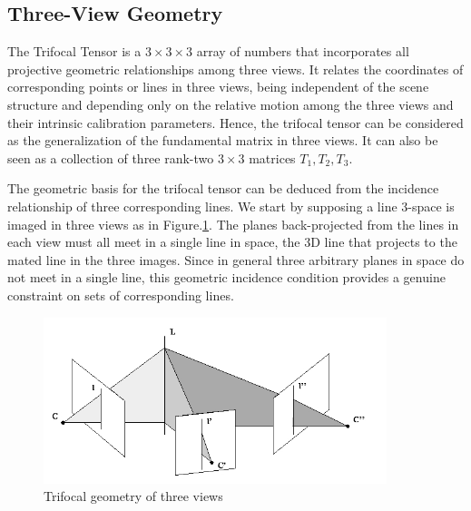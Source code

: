 \subsection{Three-View Geometry}
The Trifocal Tensor is a $3 \times 3 \times 3$ array of numbers that incorporates all projective geometric relationships among three views. It relates the coordinates of corresponding points or lines in three views, being independent of the scene structure and depending only on the relative motion among the three views and their intrinsic calibration parameters. Hence, the trifocal tensor can be considered as the generalization of the fundamental matrix in three views. It can also be seen as a collection of three rank-two $3 \times 3$ matrices $T_1, T_2, T_3$.

The geometric basis for the trifocal tensor can be deduced from the incidence relationship of three corresponding lines. We start by supposing a line 3-space is imaged in three views as in Figure.\ref{fig:threeviews}. The planes back-projected from the lines in each view must all meet in a single line in space, the 3D line that projects to the mated line in the three images. Since in general three arbitrary planes in space do not meet in a single line, this geometric incidence condition provides a genuine constraint on sets of corresponding lines.

\begin{figure}[ht!]
  \centering
  \includegraphics[width=100mm]{figures/threeviews.jpg}
  \caption{Trifocal geometry of three views}
  \label{fig:threeviews}
\end{figure}

